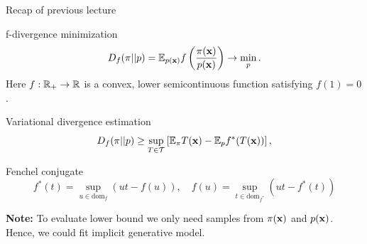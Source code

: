 

\begin{frame}
\titlepage
\end{frame}
\begin{frame}{Recap of previous lecture}
	\vspace{-0.3cm}
	\begin{block}{f-divergence minimization}
		\vspace{-0.3cm}
		\[
			D_f(\pi || p) = \mathbb{E}_{p(\mathbf{x})}  f\left( \frac{\pi(\mathbf{x})}{p(\mathbf{x})} \right) \rightarrow \min_p.
		\]
		Here $f: \mathbb{R}_+ \rightarrow \mathbb{R}$ is a convex, lower semicontinuous function satisfying $f(1) = 0$.
	\end{block}
	\begin{block}{Variational divergence estimation}
		\vspace{-0.3cm}
		\[
			D_f(\pi || p) \geq \sup_{T \in \mathcal{T}} \left[\mathbb{E}_{\pi}T(\mathbf{x}) -  \mathbb{E}_p f^*(T(\mathbf{x})) \right],
		\]
		\vspace{-0.7cm}
	\end{block}
	\begin{block}{Fenchel conjugate}
		\vspace{-0.7cm}
		\[
		f^*(t) = \sup_{u \in \text{dom}_f} \left( ut - f(u) \right), \quad f(u) = \sup_{t \in \text{dom}_{f^*}} \left( ut - f^*(t) \right)
		\]
		\vspace{-0.5cm}
	\end{block}
	\textbf{Note:} To evaluate lower bound we only need samples from $\pi(\mathbf{x})$ and $p(\mathbf{x})$. Hence, we could fit implicit generative model.
\end{frame}
